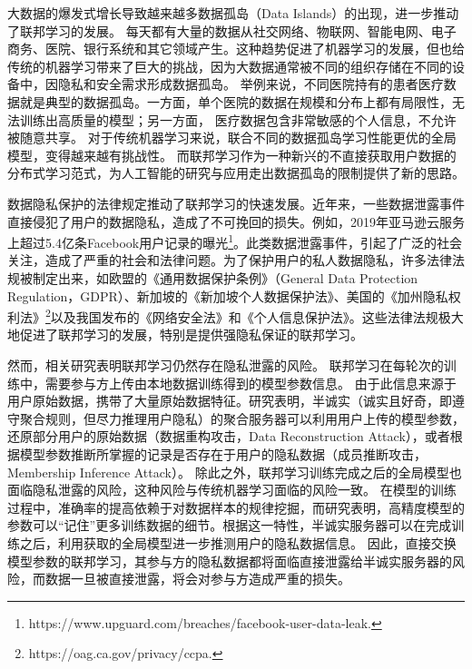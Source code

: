 大数据的爆发式增长导致越来越多数据孤岛（Data Islands）的出现，进一步推动了联邦学习的发展。
每天都有大量的数据从社交网络、物联网、智能电网、电子商务、医院、银行系统和其它领域产生\cite{hu2016energy}。这种趋势促进了机器学习的发展，但也给传统的机器学习带来了巨大的挑战，因为大数据通常被不同的组织存储在不同的设备中，因隐私和安全需求形成数据孤岛。
举例来说，不同医院持有的患者医疗数据就是典型的数据孤岛。一方面，单个医院的数据在规模和分布上都有局限性，无法训练出高质量的模型；另一方面，
医疗数据包含非常敏感的个人信息，不允许被随意共享。
对于传统机器学习来说，联合不同的数据孤岛学习性能更优的全局模型，变得越来越有挑战性。
而联邦学习作为一种新兴的不直接获取用户数据的分布式学习范式，为人工智能的研究与应用走出数据孤岛的限制提供了新的思路。

数据隐私保护的法律规定推动了联邦学习的快速发展。近年来，一些数据泄露事件直接侵犯了用户的数据隐私，造成了不可挽回的损失。例如，2019年亚马逊云服务上超过5.4亿条Facebook用户记录的曝光\footnote{https://www.upguard.com/breaches/facebook-user-data-leak.}。此类数据泄露事件，引起了广泛的社会关注，造成了严重的社会和法律问题。为了保护用户的私人数据隐私，许多法律法规被制定出来，如欧盟的《通用数据保护条例》（General Data Protection Regulation，GDPR）\cite{voigt2017eu}、新加坡的《新加坡个人数据保护法》\cite{chik2013singapore}、美国的《加州隐私权利法》\footnote{https://oag.ca.gov/privacy/ccpa.}以及我国发布的《网络安全法》\cite{netsecuritylaw}和《个人信息保护法》\cite{personal_information_protection_law}。这些法律法规极大地促进了联邦学习的发展，特别是提供强隐私保证的联邦学习。

然而，相关研究\cite{geiping2020inverting, zhu2019deep}表明联邦学习仍然存在隐私泄露的风险。
联邦学习在每轮次的训练中，需要参与方上传由本地数据训练得到的模型参数信息。
由于此信息来源于用户原始数据，携带了大量原始数据特征。研究\cite{zhu2019deep}表明，半诚实（诚实且好奇，即遵守聚合规则，但尽力推理用户隐私）的聚合服务器可以利用用户上传的模型参数，还原部分用户的原始数据（数据重构攻击，Data Reconstruction Attack），或者根据模型参数推断所掌握的记录是否存在于用户的隐私数据（成员推断攻击，Membership Inference Attack）。
除此之外，联邦学习训练完成之后的全局模型也面临隐私泄露的风险，这种风险与传统机器学习面临的风险一致。
在模型的训练过程中，准确率的提高依赖于对数据样本的规律挖掘，而研究\cite{song2017machine}表明，高精度模型的参数可以“记住”更多训练数据的细节。根据这一特性，半诚实服务器可以在完成训练之后，利用获取的全局模型进一步推测用户的隐私数据信息。
因此，直接交换模型参数的联邦学习，其参与方的隐私数据都将面临直接泄露给半诚实服务器的风险，而数据一旦被直接泄露，将会对参与方造成严重的损失。

